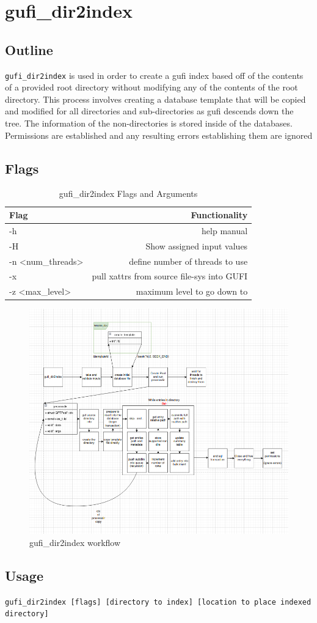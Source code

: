 \section{gufi\_dir2index}

\subsection{Outline}
\texttt{gufi\_dir2index} is used in order to create a gufi index based off of the contents of a provided root directory without modifying any of the contents of the root directory.  This process involves creating a database template that will be copied and modified for all directories and sub-directories as gufi descends down the tree. The information of the non-directories is stored inside of the databases. Permissions are established and any resulting errors establishing them are ignored

\subsection{Flags}

\begin{table} [h]
\centering
\begin{tabular}{l|r}
Flag & Functionality \\\hline
-h & help manual \\
-H & Show assigned input values \\
-n \textless num\_threads\textgreater  & define number of threads to use \\
-x & pull xattrs from source file-sys into GUFI \\
-z \textless max\_level\textgreater & maximum level to go down to
\end{tabular}
\caption{\label{fig:Flags_for_dir2index}gufi\_dir2index Flags and Arguments}
\end{table}

\begin{figure} [h]
\centering
\includegraphics[width=1.0\textwidth]{images/gufi_dir2index.png}
\caption{\label{fig:gufi_dir2index}gufi\_dir2index workflow}
\end{figure}

\subsection{Usage}
\texttt{gufi\_dir2index [flags] [directory to index] [location to place indexed directory]}


